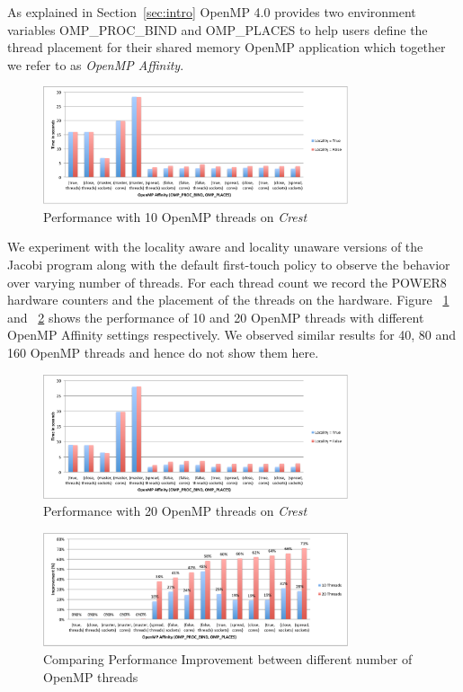 As explained in Section~\ref{sec:intro} OpenMP 4.0 provides two environment variables OMP\_PROC\_BIND and OMP\_PLACES to help users define the thread placement for their shared memory OpenMP application which together we refer to as \textit{OpenMP Affinity}.%
\begin{figure}[h!]
  \centering
  \includegraphics[height=0.4\textwidth, width=0.8\textwidth]{./Images/10Perf.pdf}
       \caption{Performance with 10 OpenMP threads on \textit{Crest}}
       \label{fig:10th}
\end{figure}
%
 We experiment with the locality aware and locality unaware versions of the Jacobi program along with the default first-touch policy to observe the behavior over varying number of threads. 
 For each thread count we record the POWER8 hardware counters and the placement of the threads on the hardware. 
 Figure ~\ref{fig:10th} and ~\ref{fig:20th} shows the performance of 10 and 20 OpenMP threads with different OpenMP Affinity settings respectively. We observed similar results for 40, 80 and 160 OpenMP threads and hence do not show them here.
%
\begin{figure}[h!]
  \centering
  \includegraphics[height=0.4\textwidth, width=0.8\textwidth]{./Images/20Perf.pdf}
       \caption{Performance with 20 OpenMP threads on \textit{Crest}}
       \label{fig:20th}
\end{figure}
%
\begin{figure}[h!]
  \centering
  \includegraphics[height=0.4\textwidth, width=0.8\textwidth]{./Images/PerfI.pdf}
       \caption{Comparing Performance Improvement between different number of OpenMP threads}
       \label{fig:imp}
\end{figure}
